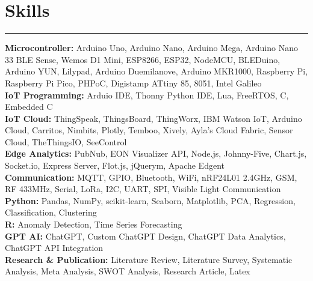 \documentclass[10pt, a4paper]{article}
\begin{document}
		\section*{Skills}
		\vspace*{-2.5mm}
		\hrule 
		\vspace*{2mm}
		\textbf{Microcontroller:} Arduino Uno, Arduino Nano, Arduino Mega, Arduino Nano 33 BLE Sense, Wemos D1 Mini, ESP8266, ESP32, NodeMCU, BLEDuino, Arduino YUN, Lilypad, Arduino Duemilanove, Arduino MKR1000, Raspberry Pi, Raspberry Pi Pico, PHPoC, Digistamp ATtiny 85, 8051, Intel Galileo 
		\\
		\textbf{IoT Programming:} Arduio IDE, Thonny Python IDE, Lua, FreeRTOS, C, Embedded C
		\\	
		\textbf{IoT Cloud:} ThingSpeak, ThingsBoard, ThingWorx, IBM Watson IoT, Arduino Cloud, Carritos, Nimbits, Plotly, Temboo, Xively, Ayla's Cloud Fabric, Sensor Cloud, TheThingsIO, SeeControl
		\\	
		\textbf{Edge Analytics:} PubNub, EON Visualizer API, Node.js, Johnny-Five, Chart.js, Socket.io, Express Server, Flot.js, jQuerym, Apache Edgent
		\\	    
		\textbf{Communication:} MQTT, GPIO, Bluetooth, WiFi, nRF24L01 2.4GHz, GSM, RF 433MHz, Serial, LoRa, I2C, UART, SPI, Visible Light Communication 
		\\
		\textbf{Python:} Pandas, NumPy, scikit-learn, Seaborn, Matplotlib, PCA, Regression, Classification, Clustering
		\\
		\textbf{R:} Anomaly Detection, Time Series Forecasting
		\\	    	
		\textbf{GPT AI:} ChatGPT, Custom ChatGPT Design, ChatGPT Data Analytics, ChatGPT API Integration
		\\
		\textbf{Research \& Publication:} Literature Review, Literature Survey, Systematic Analysis, Meta Analysis, SWOT Analysis, Research Article, Latex 

		\vspace*{-3mm}
		
	
\end{document}
